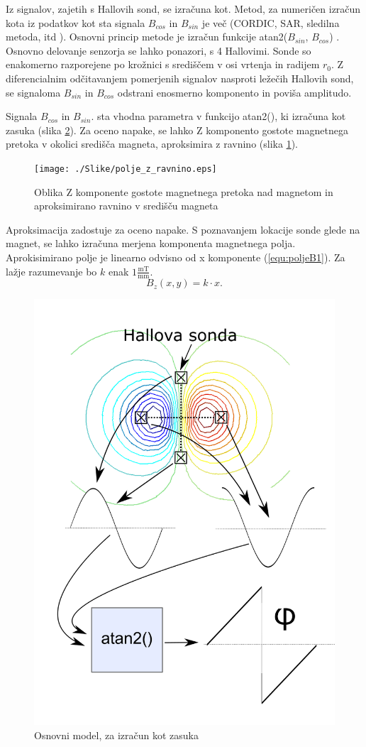 Iz signalov, zajetih s Hallovih sond, se izračuna kot. Metod, za numeričen izračun kota iz podatkov kot sta signala $B_{cos}$ in $B_{sin}$ je več (CORDIC, SAR, sledilna metoda, itd \cite{ICHaus_interpolate}). Osnovni
princip metode je izračun funkcije atan2($B_{sin}$, $B_{cos}$) \cite{atan2Matlab}.
\newpage
Osnovno delovanje senzorja se lahko ponazori, s 4 Hallovimi. Sonde so enakomerno razporejene po krožnici s središčem v osi vrtenja in radijem  $r_0$. Z diferencialnim odčitavanjem pomerjenih signalov nasproti ležečih Hallovih sond, se signaloma $B_{sin}$ in $B_{cos}$ odstrani enosmerno komponento in poviša amplitudo.

Signala $B_{cos}$ in $B_{sin}$. sta vhodna parametra v funkcijo atan2(), ki izračuna kot zasuka (slika \ref{opis_modela}).
Za oceno napake, se lahko Z komponento gostote magnetnega pretoka v okolici središča magneta, aproksimira z ravnino (slika \ref{polje_z_ravnino}).
\begin{figure}[ht]
	\centering
	\texttt{[image: ./Slike/polje\_z\_ravnino.eps]}
	\caption{Oblika Z komponente gostote magnetnega pretoka nad magnetom in aproksimirano ravnino v središču magneta}
	\label{polje_z_ravnino}
\end{figure}

Aproksimacija zadostuje za oceno napake. S poznavanjem lokacije sonde glede na magnet, se lahko izračuna merjena komponenta magnetnega polja. Aprokisimirano polje je linearno odvisno od x komponente (\ref{equ:poljeB1}).
Za lažje razumevanje bo $k$ enak $1\frac{\mathrm{mT}}{\mathrm{mm}}$.
\begin{equation}
\label{equ:poljeB1}
B_z(x,y)=k\cdot x.
\end{equation} 


\begin{figure}[ht]
	\centering
	\includegraphics[width=0.9\columnwidth]{./Slike/opis_modela.png}
	\caption{Osnovni model, za izračun kot zasuka}
	\label{opis_modela}
\end{figure}